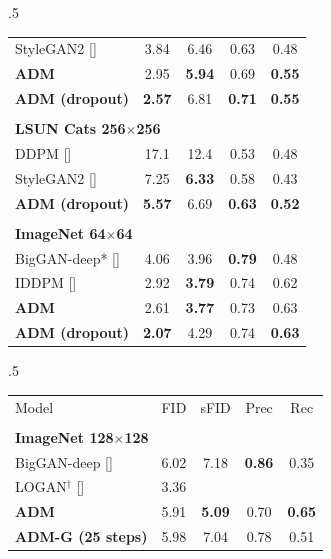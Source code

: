 \documentclass{article}
\newcommand{\shortcite}[1]{[\citenum{#1}]}
\newcommand{\ablaname}{ADM}
\newcommand{\guidedname}{ADM-G}
\begin{document}
\begin{table}[t]
\begin{center}
\begin{small}
\begin{subtable}[t]{.5\linewidth}
\begin{tabular}[t]{lcccc}
    StyleGAN2 \shortcite{stylegan2}        & 3.84          & 6.46      &  0.63      & 0.48 \\
    \bf{\ablaname{}}             & 2.95          & \bf{5.94} &  0.69      & \bf{0.55} \\
    \bf{\ablaname{} (dropout)}   & \bf{2.57}     & 6.81 &  \bf{0.71}  & \bf{0.55} \\
    \\
    \multicolumn{5}{l}{\bf{LSUN Cats} 256$\times$256} \\
    \toprule
    DDPM \shortcite{ddpm} & 17.1 & 12.4 & 0.53 & 0.48 \\
    StyleGAN2 \shortcite{stylegan2}        & 7.25          & \bf{6.33} &  0.58      & 0.43  \\
    \bf{\ablaname{} (dropout)}   & \bf{5.57}     & 6.69      &  \bf{0.63}  & \bf{0.52}  \\
    \\
    \multicolumn{5}{l}{\bf{ImageNet} 64$\times$64} \\
    \toprule
    BigGAN-deep* \shortcite{biggan}     & 4.06         & 3.96      & \bf{0.79} & 0.48  \\
    IDDPM \shortcite{improved}   & 2.92         & \bf{3.79} & 0.74      & 0.62 \\
    \bf{\ablaname{}}             & 2.61         & \bf{3.77} & 0.73      & 0.63  \\
    \bf{\ablaname{} (dropout)}   & \bf{2.07}    & 4.29      & 0.74      & \bf{0.63}  \\     
    \end{tabular}
    \end{subtable}%
    \begin{subtable}[t]{.5\linewidth}
    \begin{tabular}[t]{lcccc}
    \toprule
    Model            & FID          & sFID       & Prec & Rec \\
    \\
    \multicolumn{5}{l}{\bf{ImageNet} 128$\times$128} \\
    \toprule
    BigGAN-deep \shortcite{biggan}              & 6.02          & 7.18          & \bf{0.86}     & 0.35          \\
    LOGAN${}^\dagger$ \shortcite{logan}  & 3.36          &               &               &               \\
    \bf{\ablaname{}}                     & 5.91          & \bf{5.09}     & 0.70          & \bf{0.65}     \\
    \bf{\guidedname{} (25 steps)}      & 5.98          & 7.04          & 0.78          & 0.51          \\

\end{tabular}
\end{subtable}
\end{small}
\end{center}
\end{table}
\end{document}
